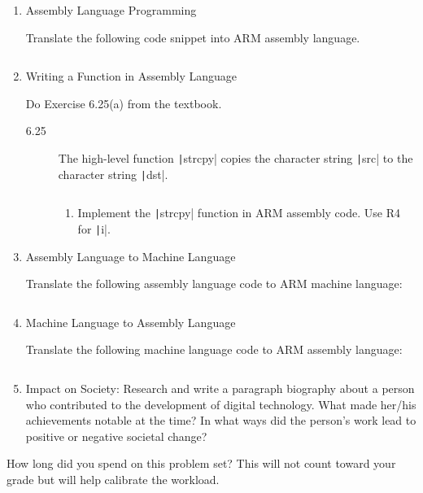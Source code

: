 \documentclass{e85}
\date{2019}
\author{}
\begin{document}
\begin{enumerate}
\item Assembly Language Programming

  Translate the following code snippet into ARM assembly language.

  \inputminted{c}{code/assembly-language-programming.c}

  \begin{solution}
  \end{solution}

\item Writing a Function in Assembly Language

  Do Exercise 6.25(a) from the textbook.
  \begin{description}
  \item[6.25] The high-level function \texttt|strcpy| copies
    the character string \texttt|src| to the character string
    \texttt|dst|.

    \inputminted{c}{code/writing-a-function-in-assembly-language.c}

    \begin{enumerate}[label=(\alph*)]
    \item Implement the \texttt|strcpy| function in ARM
      assembly code.  Use R4 for \texttt|i|.

      \begin{solution}
      \end{solution}
    \end{enumerate}
  \end{description}

\item Assembly Language to Machine Language

  Translate the following assembly language code to ARM machine
  language:

  \inputminted{text}{code/assembly-language-to-machine-language.arm}

  \begin{solution}
  \end{solution}

\item Machine Language to Assembly Language

  Translate the following machine language code to ARM assembly
  language:

  \inputminted{text}{code/machine-language-to-assembly-language}

  \begin{solution}
  \end{solution}

\item Impact on Society: Research and write a paragraph biography
  about a person who contributed to the development of digital
  technology.  What made her/his achievements notable at the time?  In
  what ways did the person's work lead to positive or negative
  societal change?

  \begin{solution}
  \end{solution}
\end{enumerate}

How long did you spend on this problem set?  This will not count
toward your grade but will help calibrate the workload.

\begin{solution}
\end{solution}
\end{document}
